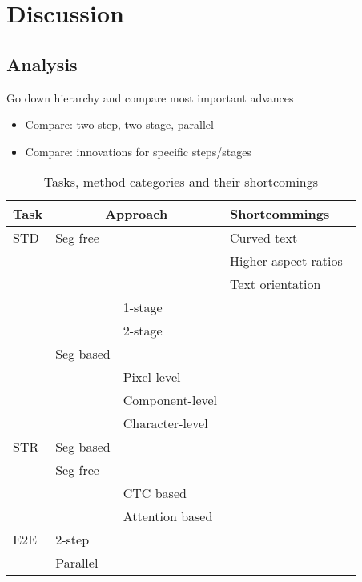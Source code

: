 \chapter{Discussion}\label{ch:discussion}
\section{Analysis}
Go down hierarchy and compare most important advances
\begin{itemize}
    \item Compare: two step, two stage, parallel
    \item Compare: innovations for specific steps/stages
\end{itemize}

\begin{table}[ht]
    \centering\scriptsize
    \begin{tabular}{p{}p{}p{}p{}}
        Task & \multicolumn{2}{c}{Approach} & Shortcommings \\
        \toprule
        STD & Seg free & & Curved text~\citep{long_scene_2021} \\
            & & & Higher aspect ratios~\citep{long_scene_2021,shi_detecting_2017}\\
            & & & Text orientation~\citep{shi_detecting_2017} \\
            & & 1-stage & \\
            & & 2-stage & \\
            & Seg based & & \\
            & & Pixel-level & \\
            & & Component-level & \\
            & & Character-level & \\
        \midrule
        STR & Seg based & & \\
            & Seg free & & \\
            & & CTC based &  \\
            & & Attention based & \\
        \midrule
        E2E & 2-step & & \\
            & Parallel & & \\
        \bottomrule
    \end{tabular}
    \caption{Tasks, method categories and their shortcomings\label{tb:steps-properties}}
\end{table}

